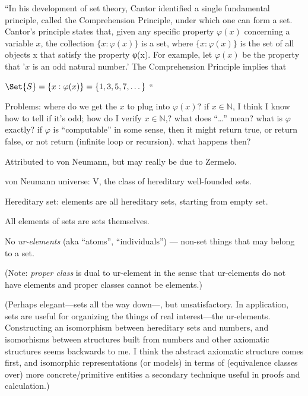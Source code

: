 ``In his development of set theory, 
Cantor identified a single fundamental principle, 
called the Comprehension Principle, 
under which one can form a set.
Cantor’s principle states that, 
given any specific property $\varphi(x)$ 
concerning a variable $x$, 
the collection $\{x:\varphi(x)\}$ is a set, 
where $\{x:\varphi(x)\}$ is 
the set of all objects x that satisfy the property φ(x).
For example, let $\varphi(x)$ be the property that 
'$x$ is an odd natural number.' 
The Comprehension Principle implies that

$\Set{S}=\{x:\varphi(x)\}=\{1,3,5,7,\dots\}$ ``\cite{iep:Set_theory}

Problems: \hfill\break
where do we get the $x$ to plug into $\varphi(x)$?\hfill\break
if $x\in\mathbb{N}$, I think I know how to tell if it's odd;
how do I verify $x\in\mathbb{N}$,?\hfill\break
what does ``\dots'' mean?\hfill\break
what is $\varphi$ exactly?\hfill\break
if $\varphi$ is ``computable'' in some sense,
then it might return true, or return false, or not return
(infinite loop or recursion). what happens then?

\label{sec:von_Neumann_universe}

Attributed to von Neumann, but may really be due to
Zermelo\cite{Zermelo:1930:ZERBGU}.

von Neumann universe: \textsf{V}\cite{wiki:Von_Neumann_universe},
the class of hereditary well-founded sets.

Hereditary set: elements are all hereditary sets, 
starting from empty set\cite{wiki:Hereditary-set}.

All elements of sets are sets themselves.

No \textsl{ur-elements}\cite{wiki:Urelement} 
(aka ``atoms'', ``individuals'') ---
non-set things that may belong to a set.

(Note: \textsl{proper class} is dual to ur-element in the sense that
ur-elements do not have elements and proper classes cannot be 
elements.)

(Perhaps elegant---sets all the way down---, but unsatisfactory. 
In application, sets are useful for organizing the things
of real interest---the ur-elements.
Constructing an isomorphism between hereditary sets
and numbers, and isomorhisms between structures built
from numbers and other axiomatic structures seems
backwards to me.
I think the abstract axiomatic structure comes first, 
and isomorphic representations (or models) in terms of 
(equivalence classes over) more concrete/primitive
entities a secondary technique useful in proofs and calculation.)

